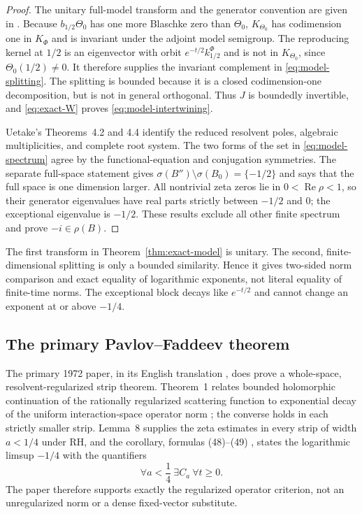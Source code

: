 \documentclass[11pt]{amsart}
\theoremstyle{definition}
\theoremstyle{remark}
\DeclareMathOperator{\Repart}{Re}
\begin{document}
\begin{proof}
The unitary full-model transform and the generator convention are given in
\cite[pp.~109--113]{Uetake2007}.  Because $b_{1/2}\Theta_0$ has one more
Blaschke zero than $\Theta_0$, $K_{\Theta_0}$ has codimension one in
$K_\Phi$ and is invariant under the adjoint model semigroup.  The reproducing
kernel at $1/2$ is an eigenvector with orbit $e^{-t/2}k_{1/2}^{\Phi}$ and is
not in $K_{\Theta_0}$, since $\Theta_0(1/2)\neq0$.  It therefore supplies the
invariant complement in \eqref{eq:model-splitting}.  The splitting is
bounded because it is a closed codimension-one decomposition, but is not in
general orthogonal.  Thus $J$ is boundedly invertible, and
\eqref{eq:exact-W} proves \eqref{eq:model-intertwining}.

Uetake's Theorems~4.2 and 4.4 identify the reduced resolvent poles, algebraic
multiplicities, and complete root system.  The two forms of the set in
\eqref{eq:model-spectrum} agree by the functional-equation and conjugation
symmetries.  The separate full-space statement
\cite[pp.~100--101]{Uetake2007} gives
$\sigma(B'')\setminus\sigma(B_0)=\{-1/2\}$ and says that the full space is one
dimension larger.  All nontrivial zeta zeros lie in
$0<\Repart\rho<1$, so their generator eigenvalues have real parts strictly
between $-1/2$ and $0$; the exceptional eigenvalue is $-1/2$.  These results
exclude all other finite spectrum and prove $-i\in\rho(B)$.
\end{proof}

The first transform in Theorem~\ref{thm:exact-model} is unitary.  The second,
finite-dimensional splitting is only a bounded similarity.  Hence it gives
two-sided norm comparison and exact equality of logarithmic exponents, not
literal equality of finite-time norms.  The exceptional block decays like
$e^{-t/2}$ and cannot change an exponent at or above $-1/4$.

\subsection{The primary Pavlov--Faddeev theorem}

The primary 1972 paper, in its English translation
\cite[\S\S3--4]{PavlovFaddeev1975}, does prove a whole-space,
resolvent-regularized strip theorem.  Theorem~1 relates bounded holomorphic
continuation of the rationally regularized scattering function to exponential
decay of the uniform interaction-space operator norm
\cite[original pp.~177--180]{PavlovFaddeev1975}; the converse holds in each
strictly smaller strip.  Lemma~8
\cite[pp.~185--186]{PavlovFaddeev1975} supplies the zeta estimates in every
strip of width $a<1/4$ under RH, and the corollary, formulas (48)--(49)
\cite[pp.~186--187]{PavlovFaddeev1975}, states the logarithmic limsup
$-1/4$ with the quantifiers
\[
 \forall a<\frac14\ \exists C_a\ \forall t\geq0.
\]
The paper therefore supports exactly the regularized operator criterion, not
an unregularized norm or a dense fixed-vector substitute.
\end{document}
